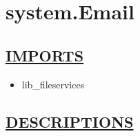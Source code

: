 \chapter*{system.Email}
\hypertarget{ecldoc:toc:system.Email}{}

\section*{\underline{IMPORTS}}
\begin{itemize}
\item lib\_fileservices
\end{itemize}

\section*{\underline{DESCRIPTIONS}}
